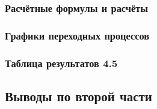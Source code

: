 
\subsubsection{Расчётные формулы и расчёты}

\subsubsection{Графики переходных процессов}

\subsubsection{Таблица результатов 4.5}

\subsection{Выводы по второй части}
